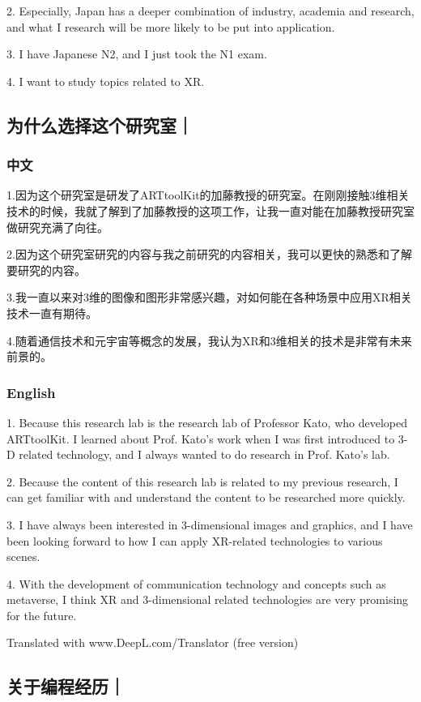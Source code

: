 \documentclass[lang=cn,11pt,a4paper]{elegantpaper}
\begin{document}
2. Especially, Japan has a deeper combination of industry, academia and research, and what I research will be more likely to be put into application.

3. I have Japanese N2, and I just took the N1 exam.

4. I want to study topics related to XR.

\subsection{为什么选择这个研究室｜}
\subsubsection{中文}
1.因为这个研究室是研发了ARTtoolKit的加藤教授的研究室。在刚刚接触3维相关技术的时候，我就了解到了加藤教授的这项工作，让我一直对能在加藤教授研究室做研究充满了向往。

2.因为这个研究室研究的内容与我之前研究的内容相关，我可以更快的熟悉和了解要研究的内容。

3.我一直以来对3维的图像和图形非常感兴趣，对如何能在各种场景中应用XR相关技术一直有期待。

4.随着通信技术和元宇宙等概念的发展，我认为XR和3维相关的技术是非常有未来前景的。
\subsubsection{English}
1. Because this research lab is the research lab of Professor Kato, who developed ARTtoolKit. I learned about Prof. Kato's work when I was first introduced to 3-D related technology, and I always wanted to do research in Prof. Kato's lab.

2. Because the content of this research lab is related to my previous research, I can get familiar with and understand the content to be researched more quickly.

3. I have always been interested in 3-dimensional images and graphics, and I have been looking forward to how I can apply XR-related technologies to various scenes.

4. With the development of communication technology and concepts such as metaverse, I think XR and 3-dimensional related technologies are very promising for the future.

Translated with www.DeepL.com/Translator (free version)

\subsection{关于编程经历｜}
\end{document}
